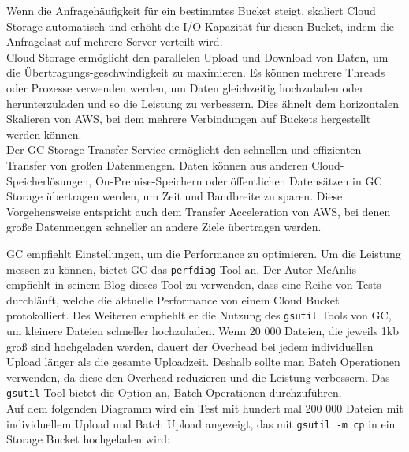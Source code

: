  Wenn die Anfragehäufigkeit für ein bestimmtes Bucket steigt, skaliert Cloud Storage automatisch und erhöht die I/O Kapazität für diesen Bucket, indem die Anfragelast auf mehrere Server verteilt wird.\\
 
Cloud Storage ermöglicht den parallelen Upload und Download von Daten, um die Übertragungs-geschwindigkeit zu maximieren. Es können mehrere Threads oder Prozesse verwenden werden, um Daten gleichzeitig hochzuladen oder herunterzuladen und so die Leistung zu verbessern. Dies ähnelt dem horizontalen Skalieren von AWS, bei dem mehrere Verbindungen auf Buckets hergestellt werden können.\\

Der GC Storage Transfer Service ermöglicht den schnellen und effizienten Transfer von großen Datenmengen. Daten können aus anderen Cloud-Speicherlösungen, On-Premise-Speichern oder öffentlichen Datensätzen in GC Storage übertragen werden, um Zeit und Bandbreite zu sparen. Diese Vorgehensweise entspricht auch dem Transfer Acceleration von AWS, bei denen große Datenmengen schneller an andere Ziele übertragen werden.

\newpage

GC empfiehlt Einstellungen, um die Performance zu optimieren. Um die Leistung messen zu können, bietet GC das \verb|perfdiag| Tool an. Der Autor McAnlis empfiehlt in seinem Blog  dieses Tool zu verwenden, dass eine Reihe von Tests durchläuft, welche die aktuelle Performance von einem Cloud Bucket protokolliert. Des Weiteren empfiehlt er die Nutzung des \verb|gsutil| Tools von GC, um kleinere Dateien schneller hochzuladen. Wenn 20 000 Dateien, die jeweils 1kb groß sind hochgeladen werden, dauert der Overhead bei jedem individuellen Upload länger als die gesamte Uploadzeit. Deshalb sollte man Batch Operationen verwenden, da diese den Overhead reduzieren und die Leistung verbessern. Das \verb|gsutil| Tool bietet die Option an, Batch Operationen durchzuführen.\\ 

Auf dem folgenden Diagramm wird ein Test mit hundert mal 200 000 Dateien mit individuellem Upload und Batch Upload angezeigt, das mit \verb|gsutil -m cp| in ein Storage Bucket hochgeladen wird:

